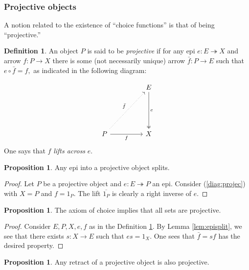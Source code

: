 \documentclass[11pt,leqno,landscape,semhelv]{seminar}
\numberwithin{equation}{section}
\theoremstyle{definition}
\newtheorem{prop}[thm]{Proposition}
\newtheorem{defn}[thm]{Definition}
\numberwithin{thm}{section}
\numberwithin{equation}{section}
\newcommand{\epi}{\twoheadrightarrow}
\begin{document}
\subsubsection{Projective objects}
A notion related to the existence of ``choice functions'' is that of being ``projective.''
\begin{defn} \label{def:projec}
	An object $P$ is said to be \emph{projective} if for any epi $e:E\epi X$ and arrow $f:P\to X$ there is some (not necessarily unique) arrow $\bar{f}:P \to E$ such that $e\circ \bar{f} = f,$ as indicated in the following diagram:
\end{defn}
\begin{equation} \label{diag:projec}
	\begin{tikzcd}
		&  & E \arrow[ddd, "e", two heads] \\&&\\&&\\
		P \arrow[rr, "f"'] \arrow[rruuu, "\bar{f}", dotted] &  & X
	\end{tikzcd}
\end{equation}
One says that $f$ \emph{lifts across} $e.$
\begin{prop}
	Any epi into a projective object splits.
\end{prop}
\begin{proof} 
	Let $P$ be a projective object and $e:E \epi P$ an epi. Consider (\ref{diag:projec}) with $X = P$ and $f = 1_P.$ The lift $\overline{1_P}$ is clearly a right inverse of $e.$
\end{proof}
\begin{prop}
	The axiom of choice implies that all sets are projective.
\end{prop}
\begin{proof} 
	Consider $E, P, X, e, f$ as in the Definition \ref{def:projec}. By Lemma \ref{lem:episplit}, we see that there exists $s:X \to E$ such that $es = 1_X.$ One sees that $\bar{f} = sf$ has the desired property.
\end{proof}
\begin{prop}
	Any retract of a projective object is also projective.
\end{prop}
\end{document}
